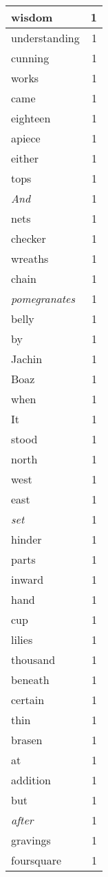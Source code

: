 \begin{center}
\begin{longtable}{l|r}
wisdom & 1 \\ \hline
understanding & 1 \\ \hline
cunning & 1 \\ \hline
works & 1 \\ \hline
came & 1 \\ \hline
eighteen & 1 \\ \hline
apiece & 1 \\ \hline
either & 1 \\ \hline
tops & 1 \\ \hline
\emph{And} & 1 \\ \hline
nets & 1 \\ \hline
checker & 1 \\ \hline
wreaths & 1 \\ \hline
chain & 1 \\ \hline
\emph{pomegranates} & 1 \\ \hline
belly & 1 \\ \hline
by & 1 \\ \hline
Jachin & 1 \\ \hline
Boaz & 1 \\ \hline
when & 1 \\ \hline
It & 1 \\ \hline
stood & 1 \\ \hline
north & 1 \\ \hline
west & 1 \\ \hline
east & 1 \\ \hline
\emph{set} & 1 \\ \hline
hinder & 1 \\ \hline
parts & 1 \\ \hline
inward & 1 \\ \hline
hand & 1 \\ \hline
cup & 1 \\ \hline
lilies & 1 \\ \hline
thousand & 1 \\ \hline
beneath & 1 \\ \hline
certain & 1 \\ \hline
thin & 1 \\ \hline
brasen & 1 \\ \hline
at & 1 \\ \hline
addition & 1 \\ \hline
but & 1 \\ \hline
\emph{after} & 1 \\ \hline
gravings & 1 \\ \hline
foursquare & 1 \\ \hline

\end{longtable}
\end{center}
